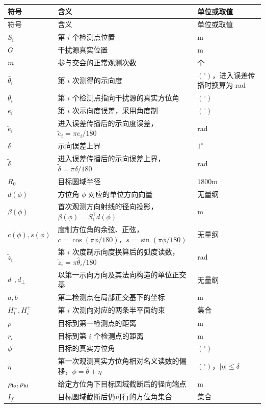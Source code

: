 \begin{longtable}{@{}p{}p{}p{}@{}}
\toprule
符号 & 含义 & 单位或取值 \\
\midrule
\endfirsthead
\toprule
符号 & 含义 & 单位或取值 \\
\midrule
\endhead
$S_i$ & 第 $i$ 个检测点位置 & m \\
$G$ & 干扰源真实位置 & m \\
$m$ & 参与交会的正常观测次数 & 个 \\
$\hat\theta_i$ & 第 $i$ 次测得的示向度 & $(^\circ)$，进入误差传播时换算为 rad \\
$\theta_i$ & 第 $i$ 个检测点指向干扰源的真实方位角 & $(^\circ)$ \\
$e_i$ & 第 $i$ 次示向度误差，采用角度制 & $(^\circ)$ \\
$\tilde e_i$ & 进入误差传播后的示向度误差，$\tilde e_i=\pi e_i/180$ & rad \\
$\delta$ & 示向误差上界 & $1^\circ$ \\
$\tilde\delta$ & 进入误差传播后的示向误差上界，$\tilde\delta=\pi\delta/180$ & rad \\
$R_0$ & 目标圆域半径 & $1800\mathrm{m}$ \\
$d(\phi)$ & 方位角 $\phi$ 对应的单位方向向量 & 无量纲 \\
$\beta(\phi)$ & 首次观测方向射线的径向投影，$\beta(\phi)=S_1^{\mathsf T}d(\phi)$ & m \\
$c(\phi),s(\phi)$ & 度制方位角的余弦、正弦，$c=\cos(\pi\phi/180)$，$s=\sin(\pi\phi/180)$ & 无量纲 \\
$\tilde z_i$ & 第 $i$ 次度制示向度换算后的弧度读数，$\tilde z_i=\pi\hat\theta_i/180$ & rad \\
$d_{\parallel},d_{\perp}$ & 以第一示向方向及其法向构造的单位正交基 & 无量纲 \\
$a,b$ & 第二检测点在局部正交基下的坐标 & m \\
$H_i^-,H_i^+$ & 第 $i$ 次测向对应的两条半平面约束 & 集合 \\
$\rho$ & 目标到第一检测点的距离 & m \\
$r_i$ & 目标到第 $i$ 个检测点的距离 & m \\
$\phi$ & 目标的真实方位角 & $(^\circ)$ \\
$\eta$ & 第一次观测真实方位角相对名义读数的偏移，$\phi=\hat\theta+\eta$ & $(^\circ)$，$|\eta|\le\delta$ \\
$\rho_{\rm lo},\rho_{\rm hi}$ & 给定方位角下目标圆域截断后的径向端点 & m \\
$I_f$ & 目标圆域截断后仍可行的方位角集合 & 集合 \\

\end{longtable}
